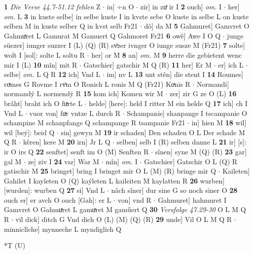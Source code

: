 \documentclass[8pt,a4paper,notitlepage]{article}
\begin{document}
\begin{table}[ht]
\begin{minipage}[t]{0.5\linewidth}
\textbf{1} \textit{Die Verse 44.7-51.12 fehlen} Z   $\cdot$ in] ÷n O  $\cdot$ zir] in zuͤ ir I \textbf{2} ouch] \textit{om.} I  $\cdot$ her] \textit{om.} L \textbf{3} in kuste selbe] in selbe kuste I in kvste sebe O kuste in selbe L on kuste selben M in kuste selber Q in kvst selb Fr21  $\cdot$ dô] da M \textbf{5} Gahmuret] Gamvret O Gahmuͯret L Gamurat M Gamuert Q Gahmoret Fr21 \textbf{6} owê] Awe I O Q  $\cdot$ junge süezer] iunger suzzer I (L) (Q) (R) svͦzer ivnger O iunge susze M (Fr21) \textbf{7} solte] wolt I [sol]: solte L soltu R  $\cdot$ her] or M \textbf{8} an] \textit{om.} M \textbf{9} herre die gebietent wenc mir I (L) \textbf{10} mîn] mit R  $\cdot$ Gatschier] gatschir M Q (R) \textbf{11} her] Er M  $\cdot$ er] ich L  $\cdot$ selbe] \textit{om.} L Q R \textbf{12} ich] Vnd L  $\cdot$ im] nv L \textbf{13} unt stên] die stent I \textbf{14} Roumes] roͮmes G Rovme I rvͦm O Ronich L ronis M Q (Fr21) Koͯnis R  $\cdot$ Normandi] normandý L normendẏ R \textbf{15} kom ich] Komen wir M  $\cdot$ zer] zir G ze O (L) \textbf{16} brâht] braht ich O fuͯrte L  $\cdot$ helde] [here]: held I ritter M ein helde Q \textbf{17} ich] ch I Vnd L  $\cdot$ vuor von] fuͯr vntze L durch R  $\cdot$ Schampanie] shanpange I tscampanie O schampine M schanpfange Q schampange R tsampanie Fr21  $\cdot$ in] hien M \textbf{18} wil] wil [beẏ]: beid Q  $\cdot$ sin] gewyn M \textbf{19} ir schaden] Den schaden O L Der schade M Q R  $\cdot$ kêren] kere M \textbf{20} irn] Jr L Q  $\cdot$ selben] selb I (R) selben danne L \textbf{21} ir] [s]: ir O irs Q \textbf{22} senftet] senft im O (M) Senften R  $\cdot$ sînen] syne M (Q) (R) \textbf{23} gar] gal M  $\cdot$ ze] ziv I \textbf{24} var] War M  $\cdot$ mîn] \textit{om.} I  $\cdot$ Gatschier] Gatschir O L (Q) R gatischir M \textbf{25} bringet] bring I bringet mir O L (M) (R) bringe mir Q  $\cdot$ Kaileten] Gahilet I kayleten O (Q) kaýleten L kaileiten M kaylatten R \textbf{26} wurben] [wurden]: wurben Q \textbf{27} si] Vnd L  $\cdot$ nâch sîner] dur sine G so noch siner O \textbf{28} ouch er] er avch O ouch [Gah]: er L  $\cdot$ von] vnd R  $\cdot$ Gahmuret] hahmuret I Gamvret O Gahmuͯret L gamuͯret M gaműert Q \textbf{30} \textit{Versfolge 47.29-30} O L M Q R   $\cdot$ vil dick] ditch G Vnd dich O (L) (M) (Q) (R) \textbf{29} unde] Vil O L M Q R  $\cdot$ minniclîche] mynneche L myndiglich Q \newline
\end{minipage}
\hspace{0.5cm}
\begin{minipage}[t]{0.5\linewidth}
\small
\begin{center}*T (U)

\end{center}
\end{minipage}
\end{table}
\end{document}
